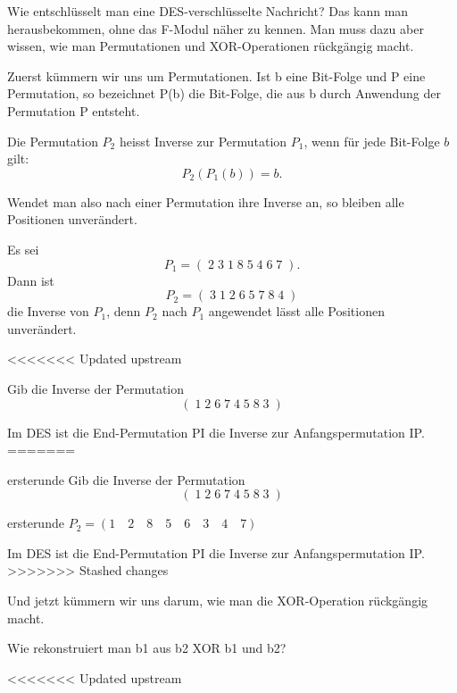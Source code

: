 \documentclass[%
<<<<<<< Updated upstream
11pt,%
twoside,%
titlepage,%
german,%
headsepline%
]{scrartcl}
\begin{document}
Wie entschlüsselt man eine DES-verschlüsselte Nachricht? 
Das kann man herausbekommen, ohne das F-Modul näher zu kennen. 
Man muss dazu aber wissen, wie man Permutationen und XOR-Operationen rückgängig macht.

Zuerst kümmern wir uns um Permutationen. Ist b eine Bit-Folge und P eine Permutation, so bezeichnet P(b) die Bit-Folge, die aus b durch Anwendung der Permutation P entsteht.
\begin{cdef}{}
Die Permutation $P_2$ heisst Inverse zur Permutation $P_1$, wenn für jede Bit-Folge $b$ gilt:
$$P_2(P_1(b)) = b.$$
\end{cdef}
Wendet man also nach einer Permutation ihre Inverse an, so bleiben alle Positionen unverändert.

\begin{bsp}
Es sei
$$P_1 = ( \;2\; 3\; 1\; 8\; 5\; 4\; 6\; 7\;).$$
Dann ist
$$P_2 = ( \;3\; 1\; 2\; 6\; 5\; 7\; 8\; 4\;)$$
die Inverse von $P_1$, denn $P_2$ nach $P_1$ angewendet lässt alle Positionen unverändert.
\end{bsp}

<<<<<<< Updated upstream
\begin{ueb}
Gib die Inverse der Permutation
$$(\;1\;2\;6\;7\;4\;5\;8\;3\;)$$
\end{ueb}

Im DES ist die End-Permutation PI die Inverse zur Anfangspermutation IP.
=======
\begin{uebenv}{ersterunde}
Gib die Inverse der Permutation
$$(\;1\;2\;6\;7\;4\;5\;8\;3\;)$$
\end{uebenv}

\begin{lsg}{ersterunde}
    $P_2=(1\quad2\quad8\quad5\quad6\quad3\quad4\quad7)$
\end{lsg}

Im DES ist die End-Permutation PI die Inverse zur Anfangspermutation IP.
>>>>>>> Stashed changes

Und jetzt kümmern wir uns darum, wie man die XOR-Operation rückgängig macht.

Wie rekonstruiert man b1 aus b2 XOR b1 und b2?

<<<<<<< Updated upstream
\end{document}

